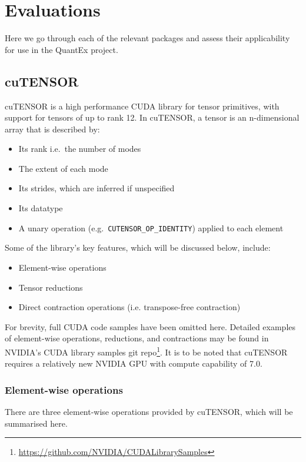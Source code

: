 \section{Evaluations}\label{evaluations}
Here we go through each of the relevant packages and assess their applicability for use in the QuantEx project.

\subsection{cuTENSOR} \label{cutensor}
cuTENSOR\cite{cuTENSOR} is a high performance CUDA library for tensor primitives, with support for tensors of up to rank 12. In cuTENSOR, a tensor is an n-dimensional array that is described by:

\begin{itemize}
\item Its rank i.e.\ the number of modes
\item The extent of each mode
\item Its strides, which are inferred if unspecified
\item Its datatype
\item A unary operation (e.g.\ \texttt{CUTENSOR\_OP\_IDENTITY}) applied to each element
\end{itemize}

\noindent Some of the library's key features, which will be discussed below, include:

\begin{itemize}
\item Element-wise operations
\item Tensor reductions
\item Direct contraction operations (i.e. transpose-free contraction)
\end{itemize}

\noindent For brevity, full CUDA code samples have been omitted here. Detailed examples of element-wise operations, reductions, and contractions may be found in NVIDIA's CUDA library samples git repo\footnote{\url{https://github.com/NVIDIA/CUDALibrarySamples}}. It is to be noted that cuTENSOR requires a relatively new NVIDIA GPU with compute capability of 7.0.


\subsubsection{Element-wise operations} \label{cutensor::elementwise}
There are three element-wise operations provided by cuTENSOR, which will be summarised here.

